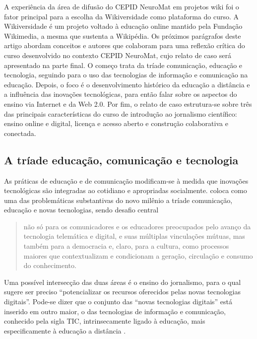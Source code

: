 \documentclass{textolivre}
\begin{document}
A experiência da área de difusão do CEPID NeuroMat em projetos wiki foi o fator principal para a escolha da Wikiversidade como plataforma do curso. A Wikiversidade é um projeto voltado à educação online mantido pela Fundação Wikimedia, a mesma que sustenta a Wikipédia. Os próximos parágrafos deste artigo abordam conceitos e autores que colaboram para uma reflexão crítica do curso desenvolvido no contexto CEPID NeuroMat, cujo relato de caso será apresentado na parte final. O começo trata da tríade comunicação, educação e tecnologia, seguindo para o uso das tecnologias de informação e comunicação na educação. Depois, o foco é o desenvolvimento histórico da educação a distância e a influência das inovações tecnológicas, para então falar sobre os aspectos do ensino via Internet e da Web 2.0. Por fim, o relato de caso estrutura-se sobre três das principais características do curso de introdução ao jornalismo científico: ensino online e digital, licença e acesso aberto e construção colaborativa e conectada.

\subsection{A tríade educação, comunicação e tecnologia}\label{sec-triade}

As práticas de educação e de comunicação modificam-se à medida que inovações tecnológicas são integradas ao cotidiano e apropriadas socialmente. \textcite[p. 57]{gomez2002} coloca como uma das problemáticas substantivas do novo milênio a tríade comunicação, educação e novas tecnologias, sendo desafio central

\begin{quote}não só para os comunicadores e os educadores preocupados pelo avanço da tecnologia telemática e digital, e suas múltiplas vinculações mútuas, mas também para a democracia e, claro, para a cultura, como processos maiores que contextualizam e condicionam a geração, circulação e consumo do conhecimento.\end{quote} 

Uma possível intersecção das duas áreas é o ensino do jornalismo, para o qual \textcite{melo2007} sugere ser preciso “potencializar os recursos oferecidos pelas novas tecnologias digitais”. Pode-se dizer que o conjunto das “novas tecnologias digitais” está inserido em outro maior, o das tecnologias de informação e comunicação, conhecido pela sigla TIC, intrinsecamente ligado à educação, mais especificamente à educação a distância 
\cites[p.~123]{belloni2002}[p.~99]{oliveira2016}.
\end{document}
